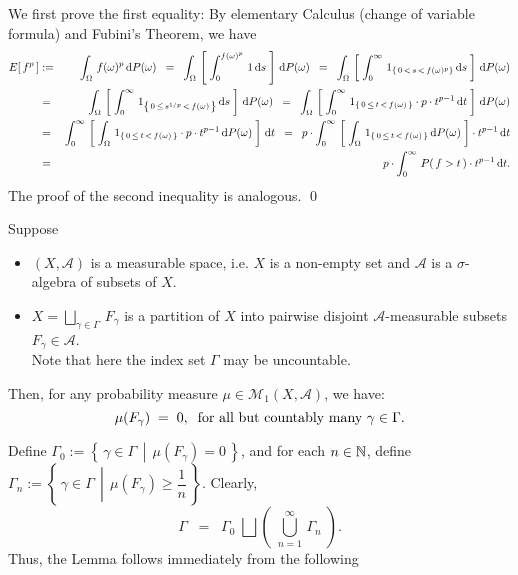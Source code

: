 \proof
\vskip 0.1cm
\noindent
We first prove the first equality:
By elementary Calculus (change of variable formula) and Fubini's Theorem, we have
\begin{eqnarray*}
E\!\left[\,f^{p}\,\right]
&:=& \int_{\Omega}\,f(\omega)^{p}\,\textnormal{d} P(\omega)
\;\;=\;\; \int_{\Omega}\,\left[\;\int_{0}^{f(\omega)^{p}}\,1\,\textnormal{d} s\;\right]\,\textnormal{d} P(\omega)
\;\;=\;\; \int_{\Omega}\,\left[\;\int_{0}^{\infty}\,1_{\left\{\,0\,<\,s\,<\,f(\omega)^{p}\right\}}\,\textnormal{d} s\;\right]\,\textnormal{d} P(\omega)
\\
&=& \int_{\Omega}\,\left[\;\int_{0}^{\infty}\,1_{\left\{\,0 \,\leq\, s^{1/p} \,<\, f(\omega)\,\right\}}\,\textnormal{d} s\;\right]\,\textnormal{d} P(\omega)
\;\;=\;\; \int_{\Omega}\,\left[\;\int_{0}^{\infty}\,1_{\left\{\,0 \,\leq\, t \,<\, f(\omega)\,\right\}}\cdot p \cdot t^{p-1} \,\textnormal{d} t\;\right]\,\textnormal{d} P(\omega)
\\
&=& \int_{0}^{\infty}\,\left[\;\int_{\Omega}\,1_{\left\{\,0 \,\leq\, t \,<\, f(\omega)\,\right\}}\cdot p \cdot t^{p-1} \,\textnormal{d} P(\omega)\;\right]\,\textnormal{d} t
\;\;=\;\; p \cdot \int_{0}^{\infty}\,\left[\;\int_{\Omega}\,1_{\left\{\,0 \,\leq\, t \,<\, f(\omega)\,\right\}}\,\textnormal{d} P(\omega)\;\right] \cdot t^{p-1} \,\textnormal{d} t
\\
&=& p \cdot \int_{0}^{\infty}\, P\!\left(\,f > t\,\right)\cdot t^{p-1} \,\textnormal{d} t.
\end{eqnarray*}
The proof of the second inequality is analogous.
\qed

\begin{lemma}
\label{LemmaUncountablePartition}
\mbox{}
\vskip 0.1cm
\noindent
Suppose
\begin{itemize}
\item	$\left(X,\mathcal{A}\right)$ is a measurable space,
		i.e. $X$ is a non-empty set and $\mathcal{A}$ is a $\sigma$-algebra of subsets of $X$.
\item	$X = \underset{\gamma\in\Gamma}{\bigsqcup}\,F_{\gamma}$ is a partition of $X$ into
		pairwise disjoint $\mathcal{A}$-measurable subsets $F_{\gamma} \in \mathcal{A}$.\\
		Note that here the index set $\Gamma$ may be uncountable.
\end{itemize}
Then, for any probability measure $\mu \in \mathcal{M}_{1}\!\left(X,\mathcal{A}\right)$, we have:
\begin{equation*}
\mu\!\left(F_{\gamma}\right) \; = \; 0,
\;\;\textnormal{for all but countably many $\gamma \in \Gamma$}.
\end{equation*}
\end{lemma}
\proof
Define
$\Gamma_{0} := \left\{\,\gamma\in\Gamma\;\,\left\vert\;\,\mu(F_{\gamma}) = 0\right.\,\right\}$,
and for each $n \in \mathbb{N}$, define
$\Gamma_{n} := \left\{\,\gamma\in\Gamma\;\,\left\vert\;\,\mu(F_{\gamma}) \geq \dfrac{1}{n}\right.\,\right\}$.
Clearly,
\begin{equation*}
\Gamma \;\; = \;\; \Gamma_{0}\;\bigsqcup\left(\;\bigcup_{n=1}^{\infty}\,\Gamma_{n}\;\right).
\end{equation*}
Thus, the Lemma follows immediately from the following

